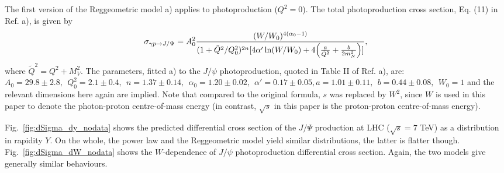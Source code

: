 \documentclass[12pt]{article}
\begin{document}
The first version of the Reggeometric model \cite{FFJS} a) applies to photoproduction ($Q^2=0$). The total photoproduction cross section, Eq. (11) in Ref. \cite{FFJS} a), is given by 
\begin{equation}
\sigma_{\gamma p \to J/\Psi}=A_0^2\frac{(W/W_0)^{4(\alpha_0-1)}}{(1+\tilde Q^2/Q^2_0)^{2n}[4\alpha'\ln(W/W_0)+4\Bigl(\frac{a}{\tilde Q^2}+\frac{b}{2m_N^2}\Bigr)]},
\end{equation}
where $\widetilde Q^2=Q^2+M_V^2$. The parameters, fitted \cite{FFJS} a) to the $J/\psi$ photoproduction, quoted in
Table II of Ref. \cite{FFJS} a), are: $A_0=29.8\pm 2.8,\ \ Q_0^2=2.1\pm 0.4,\ \
n=1.37\pm 0.14,\ \ \alpha_0 =1.20\pm 0.02,\ \ \alpha'=0.17\pm 0.05, a=1.01\pm 0.11,\ \ b=0.44\pm 0.08,\ \ W_0=1$ and the relevant dimensions here again are implied.
Note that compared to the original formula, $s$ was replaced by $W^2$, since $W$ is used in this paper to 
denote the photon-proton centre-of-mass energy (in contrast, $\sqrt{s}$ in this paper is the proton-proton centre-of-mass energy).

Fig.~\ref{fig:dSigma_dy_nodata} shows the predicted differential cross section of the $J/\Psi$ production at LHC ($\sqrt s=7$ TeV) as a distribution in rapidity $Y$.
On the whole, the power law and the Reggeometric model yield similar distributions,  the latter is flatter though.
Fig.~\ref{fig:dSigma_dW_nodata} shows the $W$-dependence of $J/\psi$ photoproduction differential cross section.
Again, the two models give generally similar behaviours.
\newpage
\end{document}
